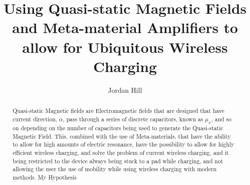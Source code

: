\documentclass[]{article}
\title{Using Quasi-static Magnetic Fields and Meta-material Amplifiers to allow for Ubiquitous Wireless Charging}
\author{Jordan Hill}
\begin{document}
\maketitle
\pagebreak
\begin{abstract}
Quasi-static Magnetic fields are Electromagnetic fields that are designed that have current direction, $\alpha$, pass through a series of discrete capacitors, known as $\mu_{x}$, and so on depending on the number of capacitors being used to generate the Quasi-static Magnetic Field. This, combined with the use of Meta-materials, that have the ability to allow for high amounts of electric resonance, have the possibility to allow for highly efficient wireless charging, and solve the problem of current wireless charging, and it being restricted to the device always being stuck to a pad while charging, and not allowing the user the use of mobility while using wireless charging with modern methods. My Hypothesis 
\end{abstract}

\pagebreak
\end{document}

